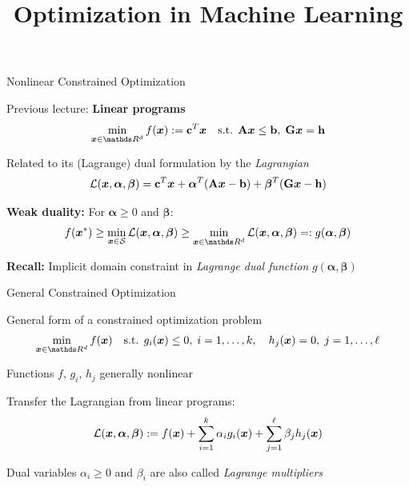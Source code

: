 \documentclass[11pt,compress,t,notes=noshow, xcolor=table]{beamer}
\title{Optimization in Machine Learning}
\begin{document}


\begin{framei}{Nonlinear Constrained Optimization}
\item Previous lecture: \textbf{Linear programs}
$$
\min_{\xv \in \R^d} f(\xv) := \mathbf{c}^T\xv \quad
\text{s.t. }  \Amat \xv \le \bv, \;
\mathbf{G} \xv = \mathbf{h}
$$
\item Related to its (Lagrange) dual formulation by the \textit{Lagrangian}
$$
\mathcal{L}(\bm{x},\bm{\alpha},\bm{\beta}) = \mathbf{c}^T \bm{x} + \bm{\alpha}^T (\mathbf{A} \bm{x} - \mathbf{b}) + \bm{\beta}^T (\mathbf{G} \bm{x} - \mathbf{h})
$$
\item \textbf{Weak duality:} For $\bm{\alpha} \geq 0$ and $\bm{\beta}$:
$$
\fxvs \geq \min_{\xv \in \S} \mathcal{L}(\xv, \bm{\alpha}, \bm{\beta}) \geq \min_{\xv \in \R^d} \mathcal{L}(\xv, \bm{\alpha}, \bm{\beta}) =: g(\bm{\alpha}, \bm{\beta})
$$
\item \textbf{Recall:} Implicit domain constraint in \textit{Lagrange dual function} $g(\bm{\alpha}, \bm{\beta})$
\end{framei}


\begin{framei}{General Constrained Optimization}
\item General form of a constrained optimization problem
$$
\min_{\xv \in \R^d} f(\xv) \quad
\text{s.t. } g_i(\xv) \le 0, \; i=1,\ldots, k, \quad
h_j(\xv) = 0, \; j=1,\ldots, \ell
$$
\item Functions $f$, $g_i$, $h_j$ generally nonlinear
\item Transfer the Lagrangian from linear programs:
$$
\mathcal{L}(\bm{x}, \bm{\alpha}, \bm{\beta}) := f(\bm{x}) + \sum_{i=1}^k \alpha_i g_i(\bm{x}) + \sum_{j=1}^\ell \beta_j h_j(\bm{x})
$$
\item Dual variables $\alpha_i \ge 0$ and $\beta_i$ are also called \textit{Lagrange multipliers}
\end{framei}
\end{document}

